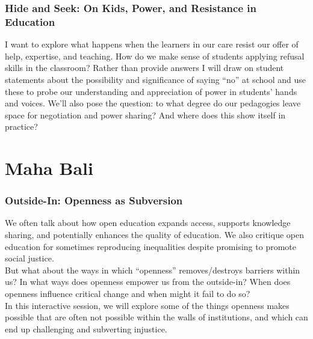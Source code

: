 \documentclass[
]{book}
\begin{document}
\begin{reflect}
\hypertarget{hide-and-seek-on-kids-power-and-resistance-in-education}{%
\subsubsection{Hide and Seek: On Kids, Power, and Resistance in
Education}\label{hide-and-seek-on-kids-power-and-resistance-in-education}}

I want to explore what happens when the learners in our care resist our
offer of help, expertise, and teaching. How do we make sense of students
applying refusal skills in the classroom? Rather than provide answers I
will draw on student statements about the possibility and significance
of saying ``no'' at school and use these to probe our understanding and
appreciation of power in students' hands and voices. We'll also pose the
question: to what degree do our pedagogies leave space for negotiation
and power sharing? And where does this show itself in practice?
\end{reflect}

\hypertarget{maha-bali}{%
\section*{Maha Bali}\label{maha-bali}}

\begin{reflect}
\hypertarget{outside-in-openness-as-subversion}{%
\subsubsection{Outside-In: Openness as
Subversion}\label{outside-in-openness-as-subversion}}

We often talk about how open education expands access, supports
knowledge sharing, and potentially enhances the quality of education. We
also critique open education for sometimes reproducing inequalities
despite promising to promote social justice.\\
But what about the ways in which ``openness'' removes/destroys barriers
within us? In what ways does openness empower us from the outside-in?
When does openness influence critical change and when might it fail to
do so?\\
In this interactive session, we will explore some of the things openness
makes possible that are often not possible within the walls of
institutions, and which can end up challenging and subverting injustice.
\end{reflect}
\end{document}
